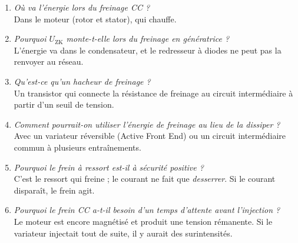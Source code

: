 \documentclass[11pt,a4paper]{article}
\begin{document}
\begin{enumerate}[label=\textbf{Q\arabic*:},leftmargin=2.2em]
  Sans mouvement, rien n'est induit.
\item \emph{Où va l'énergie lors du freinage CC ?}\\
  Dans le moteur (rotor et stator), qui chauffe.
\item \emph{Pourquoi $U_\mathrm{ZK}$ monte-t-elle lors du freinage en génératrice ?}\\
  L'énergie va dans le condensateur, et le redresseur à diodes ne peut pas la renvoyer au réseau.
\item \emph{Qu'est-ce qu'un hacheur de freinage ?}\\
  Un transistor qui connecte la résistance de freinage au circuit intermédiaire à partir d'un
  seuil de tension.
\item \emph{Comment pourrait-on utiliser l'énergie de freinage au lieu de la dissiper ?}\\
  Avec un variateur réversible (Active Front End) ou un circuit intermédiaire commun à plusieurs entraînements.
\item \emph{Pourquoi le frein à ressort est-il à sécurité positive ?}\\
  C'est le ressort qui freine ; le courant ne fait que \emph{desserrer}. Si le courant disparaît,
  le frein agit.
\item \emph{Pourquoi le frein CC a-t-il besoin d'un temps d'attente avant l'injection ?}\\
  Le moteur est encore magnétisé et produit une tension rémanente. Si le variateur injectait
  tout de suite, il y aurait des surintensités.
\end{enumerate}

\end{document}
